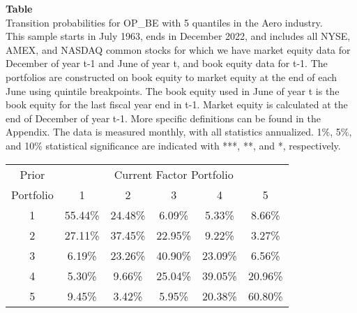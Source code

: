 \begin{table*}[ht!]
\raggedright
{}
\label{tab: transition_probs_OP_BE_Aero_with_5_quantiles}
\textbf{Table \thetable} \\
Transition probabilities for OP_BE with 5 quantiles in the Aero industry. \\
\hspace*{1em}This sample starts in July 1963, ends in December 2022, and includes all NYSE, AMEX, and NASDAQ common stocks for which we have market equity data for December of year t-1 and June of year t, and book equity data for t-1. The portfolios are constructed on book equity to market equity at the end of each June using quintile breakpoints.  The book equity used in June of year t is the book equity for the last fiscal year end in t-1.  Market equity is calculated at the end of December of year t-1.  More specific definitions can be found in the Appendix.  The data is measured monthly, with all statistics annualized.  1\%, 5\%, and 10\% statistical significance are indicated with ***, **, and *, respectively. \\
\vspace{0.5em}
\centering
\begin{adjustbox}{max width=\textwidth}
\begin{tabular}{@{}cccccc@{}}
\toprule
Prior & \multicolumn{5}{c}{Current Factor Portfolio} \\
Portfolio & 1 & 2 & 3 & 4 & 5 \\
\midrule
1 & 55.44\% & 24.48\% & 6.09\% & 5.33\% & 8.66\% \\
2 & 27.11\% & 37.45\% & 22.95\% & 9.22\% & 3.27\% \\
3 & 6.19\% & 23.26\% & 40.90\% & 23.09\% & 6.56\% \\
4 & 5.30\% & 9.66\% & 25.04\% & 39.05\% & 20.96\% \\
5 & 9.45\% & 3.42\% & 5.95\% & 20.38\% & 60.80\% \\
\bottomrule
\end{tabular}
\end{adjustbox}
\end{table*}